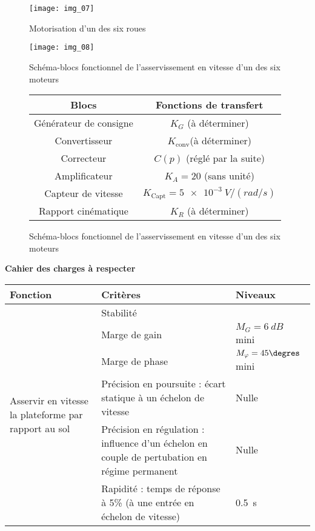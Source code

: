 \begin{figure}[H]
\centering
\texttt{[image: img\_07]}
\caption{Motorisation d'un des six roues\label{img:07}}
\end{figure}

\begin{figure}[H]
\centering
\texttt{[image: img\_08]}
\caption{Schéma-blocs fonctionnel de l’asservissement en vitesse d’un des six moteurs\label{img:08}}
\end{figure}


\begin{figure}[H]
\centering
\begin{tabular}{cc}
\hline
\textbf{Blocs} & \textbf{Fonctions de transfert} 	\\ \hline\hline
Générateur de consigne 	& $K_G$ (à déterminer) 		\\ \hline
Convertisseur 		& $K_{\text{conv}}$(à déterminer)	\\ \hline
Correcteur 		& $C(p)$ (réglé par la suite)	\\ \hline
Amplificateur 		& $K_A = 20 $ (sans unité)	\\ \hline
Capteur de vitesse 	& $K_{\text{Capt}}= \SI{5e-3}{V/(rad/s)}$ 	\\ \hline
Rapport cinématique 	& $K_R$ (à déterminer) 	\\ \hline
\end{tabular}

\caption{Schéma-blocs fonctionnel de l’asservissement en vitesse d’un des six moteurs\label{img:09}}
\end{figure}

\textbf{Cahier des charges à respecter}

\begin{center}
\begin{tabular}{lp{9cm}l}
\hline
\textbf{Fonction} & \textbf{Critères} & \textbf{Niveaux} \\ \hline\hline
\multirow{7}{3cm}{Asservir en vitesse la plateforme par rapport au sol} & 
Stabilité & \\ %
& Marge de gain		& $M_G=\SI{6}{dB}$ mini \\ %
& Marge de phase	& $M_{\varphi} =45\degres$ mini \\ \cline{2-3}
& Précision en poursuite : écart statique à un échelon de vitesse & Nulle \\ %
& Précision en régulation : influence d'un échelon en couple de pertubation en régime permanent  & Nulle \\ \cline{2-3}%
& Rapidité : temps de réponse à 5\% (à une entrée en échelon de vitesse) & \SI{0,5}{s} \\ \hline
\end{tabular}
\end{center}
\fi


